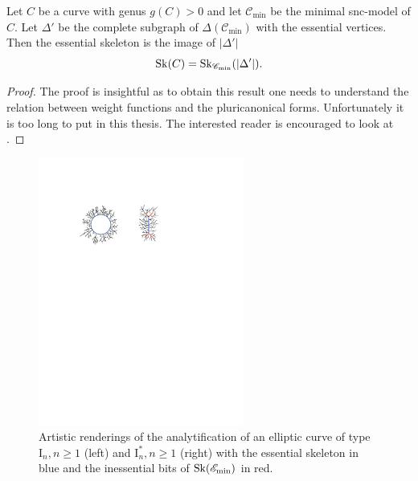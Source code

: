 \begin{theorem}
	Let $C$ be a curve with genus $g(C) > 0$ and let $\mathscr C_\text{min} $ be the minimal snc-model of $C$. 
	Let $\Delta'$ be the complete subgraph of $\Delta(\mathscr C_\text{min} )$ with the essential vertices. 
	Then the essential skeleton is the image of $|\Delta'|$\[
		\operatorname{Sk}(C) = \operatorname{Sk}_{\mathscr C_\text{min} }(|\Delta'|)
	.\] 
\end{theorem}
\begin{proof}
	The proof is insightful as to obtain this result one needs to understand the relation between weight functions and the pluricanonical forms.
	Unfortunately it is too long to put in this thesis. 
	The interested reader is encouraged to look at \cite[thm 3.3.13]{bakerWeightFunctionsBerkovich2016}. 
\end{proof}
\begin{figure}[h]
	\centering
	\includegraphics[width=0.6\textwidth]{chapters/weight/figures/essential_skeleton_elliptic.pdf}
	\caption{Artistic renderings of the analytification of an elliptic curve of type $\mathrm I_n, n \ge 1$ (left) and $\mathrm I_n^*, n \ge 1$ (right) with the essential skeleton in blue and the inessential bits of  $\operatorname{Sk}(\mathscr E_\text{min} )$ in red. }
	\label{fig:}
\end{figure}

